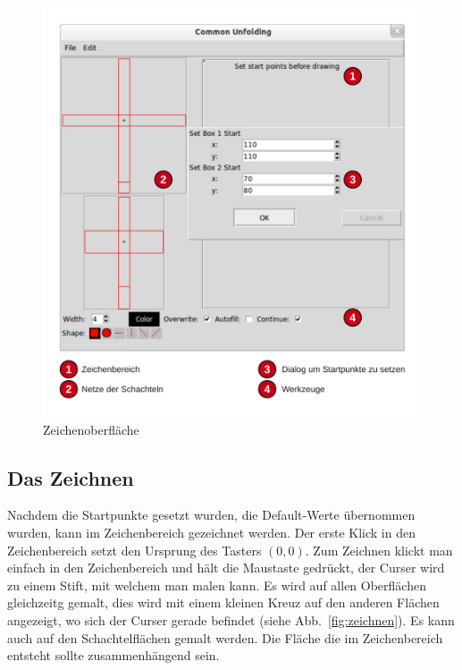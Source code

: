 \begin{figure}[htbp]
  \centering
  \includegraphics[scale=0.5]{03_pics/Zeichenbereich.pdf}
  \caption{Zeichenoberfläche}
  \label{fig:zeichenoberflaeche}
\end{figure}

\subsection{Das Zeichnen}
\label{subsec:zeichnen}
Nachdem die Startpunkte gesetzt wurden, \bzw die Default-Werte übernommen wurden, kann im Zeichenbereich gezeichnet werden. Der erste Klick in den Zeichenbereich setzt den Ursprung des Tasters $(0,0)$. Zum Zeichnen klickt man einfach in den Zeichenbereich und hält die Maustaste gedrückt, der Curser wird zu einem Stift, mit welchem man malen kann. Es wird auf allen Oberflächen gleichzeitg gemalt, dies wird mit einem kleinen Kreuz auf den anderen Flächen angezeigt, wo sich der Curser gerade befindet (siehe Abb.~\ref{fig:zeichnen}). Es kann auch auf den Schachtelflächen gemalt werden. Die Fläche die im Zeichenbereich entsteht sollte zusammenhängend sein.

